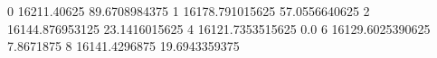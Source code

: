 0 16211.40625 89.6708984375
1 16178.791015625 57.0556640625
2 16144.876953125 23.1416015625
4 16121.7353515625 0.0
6 16129.6025390625 7.8671875
8 16141.4296875 19.6943359375
